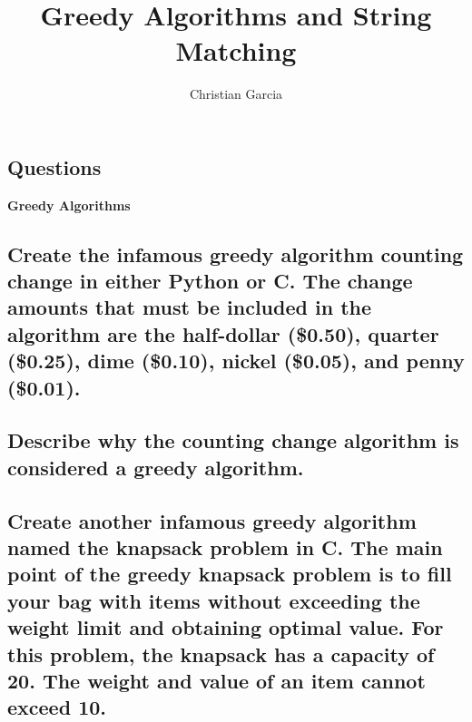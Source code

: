 \documentclass{article}
\title{Greedy Algorithms and String Matching}
\author{Christian Garcia}
\begin{document}
\maketitle


\begin{Huge}
\section*{Questions}
\end{Huge}

\begin{itemize}
\begin{Large}
\item{\textbf{Greedy Algorithms}}
\end{Large}

\subsection{Create the infamous greedy algorithm counting change in either Python or C. The change amounts that must be included in the algorithm are the half-dollar (\$0.50), quarter (\$0.25), dime (\$0.10), nickel (\$0.05), and penny (\$0.01).}

\vspace{24pt}

\subsection{Describe why the counting change algorithm is considered a greedy algorithm.}

\pagebreak{}

\subsection{Create another infamous greedy algorithm named the knapsack problem in C. The main point of the greedy knapsack problem is to fill your bag with items without exceeding the weight limit and obtaining optimal value. For this problem, the knapsack has a capacity of 20. The weight and value of an item cannot exceed 10. }

\vspace{24pt}


\end{itemize}
\end{document}
